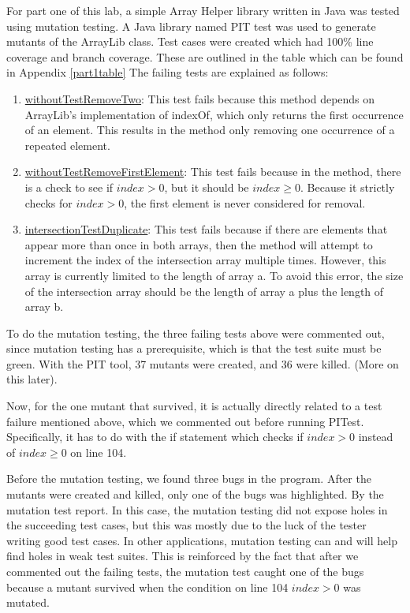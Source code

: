 For part one of this lab, a simple Array Helper library written in Java was
tested using mutation testing. A Java library named PIT test was used to 
generate mutants of the ArrayLib class. Test cases were created which had 100\%
line coverage and branch coverage. These are outlined in the table which can be found in Appendix \ref{part1table}
The failing tests are explained as follows:

\begin{enumerate}
\item \underline{withoutTestRemoveTwo}:
        This test fails because this method depends on ArrayLib's implementation
        of indexOf, which only returns the first occurrence of an element. This
        results in the method only removing one occurrence of a repeated
        element.
\item \underline{withoutTestRemoveFirstElement}:
        This test fails because in the method, there is a check to see if
        $index > 0$, but it should be $index \geq 0$. Because it strictly checks
        for $index > 0$, the first element is never considered for removal.
\item \underline{intersectionTestDuplicate}:
        This test fails because if there are elements that appear more than once
        in both arrays, then the method will attempt to increment the index
        of the intersection array multiple times. However, this array is
        currently limited to the length of array a. To avoid this error, the
        size of the intersection array should be the length of array a plus the
        length of array b. 
\end{enumerate}

To do the mutation testing, the three failing tests above were commented out,
since mutation testing has a prerequisite, which is that the test suite must be
green. With the PIT tool, 37 mutants were created, and 36 were killed. (More on
this later).



Now, for the one mutant that survived, it is actually directly related to a test
failure mentioned above, which we commented out before running PITest.
Specifically, it has to do with the if statement which checks if $index > 0$
instead of $index \geq 0$ on line 104. 


Before the mutation testing, we found three bugs in the program. After the
mutants were created and killed, only one of the bugs was highlighted. By the
mutation test report. In this case, the mutation testing did not expose holes in
the succeeding test cases, but this was mostly due to the luck of the tester
writing good test cases. In other applications, mutation testing can and will
help find holes in weak test suites. This is reinforced by the fact that after
we commented out the failing tests, the mutation test caught one of the bugs
because a mutant survived when the condition on line 104 $index > 0$ was mutated.

